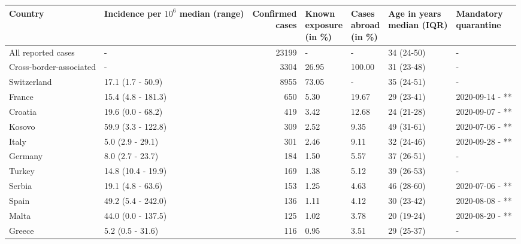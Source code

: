 \documentclass[10pt, a4paper, twoside]{article}
\begin{document}
\begin{table}
\begingroup\footnotesize
\begin{tabular}{llrllll}
  \hline
Country &\makecell{Incidence\\per $10^6$\\median (range)} &\makecell{Confirmed\\cases} &\makecell{Known\\exposure\\(in \%)} &\makecell{Cases\\abroad\\(in \%)} &\makecell{Age in years\\median (IQR)} &\makecell{Mandatory\\quarantine} \\ 
  \hline
All reported cases &  -  & 23199 &  -  &  -  & 34 (24-50) &  -  \\ 
  Cross-border-associated &  -  & 3304 & 26.95 & 100.00 & 31 (23-48) &  -  \\ 
  Switzerland & 17.1 (1.7 - 50.9) & 8955 & 73.05 &  -  & 35 (24-51) &  -  \\ 
  France & 15.4 (4.8 - 181.3) & 650 & 5.30 & 19.67 & 29 (23-41) & 2020-09-14 - ** \\ 
  Croatia & 19.6 (0.0 - 68.2) & 419 & 3.42 & 12.68 & 24 (21-28) & 2020-09-07 - ** \\ 
  Kosovo & 59.9 (3.3 - 122.8) & 309 & 2.52 & 9.35 & 49 (31-61) & 2020-07-06 - ** \\ 
  Italy & 5.0 (2.9 - 29.1) & 301 & 2.46 & 9.11 & 32 (24-46) & 2020-09-28 - ** \\ 
  Germany & 8.0 (2.7 - 23.7) & 184 & 1.50 & 5.57 & 37 (26-51) &  -  \\ 
  Turkey & 14.8 (10.4 - 19.9) & 169 & 1.38 & 5.12 & 39 (26-53) &  -  \\ 
  Serbia & 19.1 (4.8 - 63.6) & 153 & 1.25 & 4.63 & 46 (28-60) & 2020-07-06 - ** \\ 
  Spain & 49.2 (5.4 - 242.0) & 136 & 1.11 & 4.12 & 30 (23-42) & 2020-08-08 - ** \\ 
  Malta & 44.0 (0.0 - 137.5) & 125 & 1.02 & 3.78 & 20 (19-24) & 2020-08-20 - ** \\ 
  Greece & 5.2 (0.5 - 31.6) & 116 & 0.95 & 3.51 & 29 (25-37) &  -  \\ 

\end{tabular}
\end{table}
\end{document}
